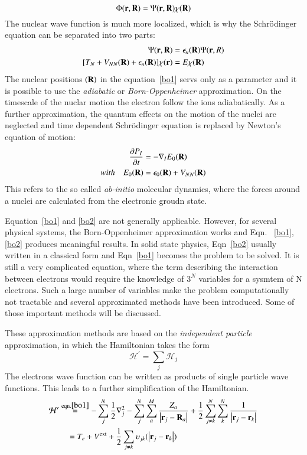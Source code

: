 \begin{equation}
\Phi(\vb{r},\vb{R}) = \Psi(\vb{r},\vb{R})\chi(\vb{R})
\end{equation}
The nuclear wave function is much more localized, which is why the Schr\"odinger equation can be separated into two parts:
\begin{align}
[T_e + V_{ee}(\vb{r}) + V_{Ne}(\vb{r},\vb{R})]\Psi(\vb{r},\vb{R}) & = \epsilon_n(\vb{R})\Psi(\vb{r},{R})\label{bo1} \\
[T_N + V_{NN}(\vb{R}) + \epsilon_n(\vb{R})]\chi(\vb{r}) & = E\chi(\vb{R})\label{bo2}
\end{align}
The nuclear positions $(\vb{R})$ in the equation~\eqref{bo1} servs only as a parameter and it is possible to use the \textit{adiabatic} or \textit{Born-Oppenheimer} approximation. On the timescale of the nuclar motion the electron follow the ions adiabatically. As a further approximation, the quantum effects on the motion of the nuclei are neglected and time dependent Schr\"odinger equation is replaced by Newton's equation of motion:
\begin{align}
\frac{\partial P_I}{\partial t} & = -\nabla_I E_0 (\vb{R}) \\
with \quad E_0(\vb{R}) & = \epsilon_0(\vb{R}) + V_{NN}(\vb{R})
\end{align}
This refers to the so called \textit{ab-initio} molecular dynamics, where the forces around a nuclei are calculated from the electronic groudn state.

Equation~\ref{bo1} and \ref{bo2} are not generally applicable. However, for several physical systems, the Born-Oppenheimer approximation works and Eqn. ~\ref{bo1}, \ref{bo2} produces meaningful results. In solid state physics, Eqn~\eqref{bo2} usually written in a classical form and Eqn~\eqref{bo1} becomes the problem to be solved. It is still a very complicated equation, where the term describing the interaction between electrons would require the knowledge of $3^N$ variables for a sysmtem of N electrons. Such a large number of variables make the problem computationally not tractable and several approximated methods have been introduced. Some of those important methods will be discussed.

These approximation methods are based on the \textit{independent particle} approximation, in which the Hamiltonian takes the form
\begin{equation}
	\mathcal{H}^{\prime} = \sum_j \mathcal{H}_j
\end{equation}
The electrons wave function can be written as products of single particle wave functions. This leads to a further simplification of the Hamiltonian. 
\begin{align}\label{ham1}
	\mathcal{H}^{\prime} & \stackrel{\text{eqn.} \ref{bo1}} = -\sum_j^N \frac{1}{2}\nabla^2_j - \sum_j^N\sum_a^M \frac{Z_a}{\abs{\vb{r}_j - \vb{R}_a}} + \frac{1}{2}\sum^N_{j\neq k}\sum^N_k\frac{1}{\abs{\vb{r}_j - \vb{r}_k}} \nonumber \\ 
	 &\quad  = T_e + V^{\text{ext}} + \frac{1}{2}\sum_{j\neq k} \upsilon_{jk}(\abs{\vb{r}_j - \vb{r}_k}) 
\end{align}



